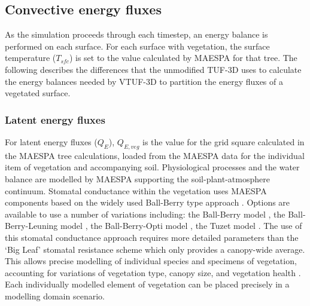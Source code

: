 \documentclass[final,3p,times,authoryear]{elsarticle}
\begin{document}


\subsection{Convective energy fluxes}

As the simulation proceeds through each timestep, an energy balance is performed on each surface. For each surface with vegetation, the surface temperature ($T_{sfc}$) is set to the value calculated by MAESPA for that tree. The following describes the differences that the unmodified TUF-3D uses to calculate the energy balances needed by VTUF-3D to partition the energy fluxes of a vegetated surface.

\subsubsection{Latent energy fluxes}
\label{sec:calcleaftemp}

For latent energy fluxes ($Q_{E}$), $Q_{E,veg}$ is the value for the grid square calculated in the MAESPA tree calculations, loaded from the MAESPA data for the individual item of vegetation and accompanying soil. Physiological processes and the water balance are modelled by MAESPA supporting the soil-plant-atmosphere continuum. Stomatal conductance within the vegetation uses MAESPA components based on the widely used Ball-Berry type approach \citep{Ball1987,Duursma2012}. Options are available to use a number of variations including: the Ball-Berry model \citep{Ball1987}, the Ball-Berry-Leuning model \citep{Leuning1995}, the Ball-Berry-Opti model \citep{Medlyn2011}, the Tuzet model \citep{Tuzet2003}. The use of this stomatal conductance approach requires more detailed parameters than the `Big Leaf' stomatal resistance scheme \citep{Bailey1981,Kowalczyk1991} which only provides a canopy-wide average. This allows precise modelling of individual species and specimens of vegetation, accounting for variations of vegetation type, canopy size, and vegetation health \citep{Duursma2012}. Each individually modelled element of vegetation can be placed precisely in a modelling domain scenario.
\end{document}
